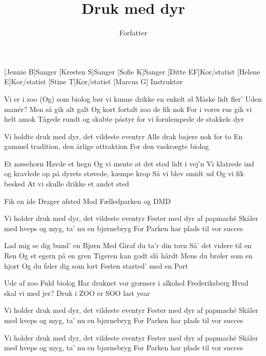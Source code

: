 \documentclass[a4paper,11pt]{article}
\title{Druk med dyr}
\author{Forfatter}
\begin{document}
\maketitle

\begin{roles}
[Jennie B]Sanger
[Kresten S]Sanger
[Sofie K]Sanger
[Ditte EF]Kor/statist
[Helene E]Kor/statist
[Stine T]Kor/statist
[Marcus G] Instruktør
\end{roles}

\begin{song}

Vi er i zoo
(Og) som biolog
bør vi kunne drikke en enkelt øl
Måske lidt fler'
Uden manér?
Men så gik alt galt
Og kort fortalt
zoo de fik nok
For i vores rus gik vi helt amok
Tågede rundt
og skabte påstyr
for vi forulempede de stakkels dyr


Vi holdte druk med dyr,
det vildeste eventyr
Alle drak bajere nok for to
En gammel tradition, 
den årlige attraktion
For den vaskeægte biolog

Et næsehorn
Havde et hegn
Og vi mente at 
det stod lidt i vej'n
Vi klatrede ind
og kravlede op
på dyrets støvede, kæmpe krop 
Så vi blev smidt ud
Og vi fik besked
At vi skulle drikke et andet sted

Fik en ide
Drager afsted
Mod Fælledparken og DMD


Vi holder druk med dyr, 
det vildeste eventyr
Fester med dyr af papmaché
Skåler med hveps og myg, 
ta' nu en bjørnebryg
For Parken har plads til vor succes


Lad mig se dig bund' en Bjørn
Med Giraf du ta'r din tørn
Så' det videre til en Ren
Og et egern på en gren
Tigeren kan godt slå hårdt
Mens du brøler som en hjort
Og du føler dig som lort
Festen started' med en Port

Ude af zoo
Fuld biolog
Har druknet vor grænser i alkohol
Frederiksberg
Hvad skal vi med jer?
Druk i ZOO er SOO last year

Vi holder druk med dyr, 
det vildeste eventyr
Fester med dyr af papmaché
Skåler med hveps og myg, 
ta' nu en bjørnebryg
For Parken har plads til vor succes

Vi holder druk med dyr, 
det vildeste eventyr
Fester med dyr af papmaché
Skåler med hveps og myg, 
ta' nu en bjørnebryg
For Parken har plads til vor succes
\end{song}
\end{document}

